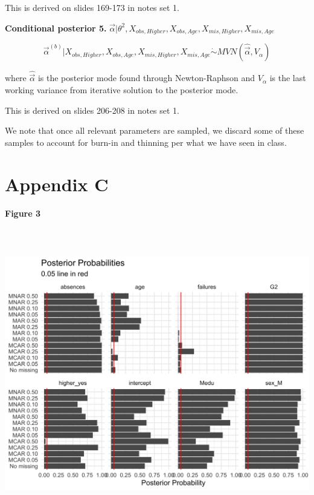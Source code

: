 \documentclass[11pt]{article}
\begin{document}
This is derived on slides 169-173 in notes set 1.

\vspace{0.25in}

\textbf{Conditional posterior 5.} $\vec\alpha| \theta^2, X_{obs, Higher}, X_{obs, Age}, X_{mis, Higher}, X_{mis, Age}$

$$\vec\alpha^{(b)}|  X_{obs, Higher}, X_{obs, Age}, X_{mis, Higher}, X_{mis, Age} \dot\sim MVN(\hat{\vec\alpha}, V_{\alpha})$$

where $\hat{\vec\alpha}$ is the posterior mode found through Newton-Raphson and $V_{\alpha}$ is the last working variance from iterative solution to the posterior mode.

This is derived on slides 206-208 in notes set 1.

We note that once all relevant parameters are sampled, we discard some of these samples to account for burn-in and thinning per what we have seen in class.

\newpage

\section{Appendix C}

\textbf{Figure 3}

\includegraphics[width=6.5in, height=5in]{posterior-probabilities-1}
\end{document}
